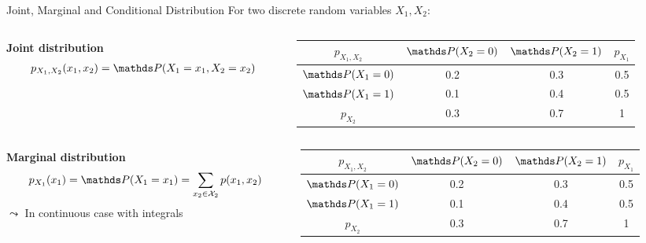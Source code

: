 \documentclass[10pt,compress,t,notes=noshow, xcolor=table]{beamer}
\begin{document}
\begin{frame}{Joint, Marginal and Conditional Distribution}
    For two discrete random variables $X_1, X_2$:
    
    \begin{columns}[c, totalwidth=\textwidth]
    \begin{column}{0.5\textwidth}
    \textbf{Joint distribution}
        \begin{align*}
            p_{X_1, X_2}(x_1,x_2) = \P(X_1 = x_1, X_2 = x_2) %
        \end{align*}
    \end{column}
    \begin{column}{0.5\textwidth}
    \begin{table}
    \scriptsize
        \begin{tabular}{|c|c|c|c|}
            \hline 
            $p_{X_1, X_2}$ & $\P(X_2 = 0)$ & $\P(X_2 = 1)$ & $p_{X_1}$ \\
            \hline
            $\P(X_1 = 0)$ & \cellcolor{gray}0.2 & \cellcolor{gray}0.3 & 0.5  \\
            \hline
            $\P(X_1 = 1)$ & \cellcolor{gray}0.1 & \cellcolor{gray}0.4 & 0.5  \\
            \hline
            $p_{X_2}$ & 0.3 & 0.7 & 1  \\
            \hline
        \end{tabular} 
    \end{table}
    \end{column}
    \end{columns} 

\medskip\pause
    
\begin{columns}[c, totalwidth=\textwidth]
    \begin{column}{0.5\textwidth}
    \textbf{Marginal distribution}
        \begin{align*}
            p_{X_1}(x_1) = \P(X_1 = x_1) = \sum_{x_2\in \mathcal{X}_2} p(x_1,x_2)
        \end{align*}    
        $\leadsto$ In continuous case with integrals
    \end{column}
    \begin{column}{0.5\textwidth}
    \begin{table}
    \scriptsize
        \begin{tabular}{|c|c|c|c|}
            \hline 
            $p_{X_1, X_2}$ & $\P(X_2 = 0)$ & $\P(X_2 = 1)$ & $p_{X_1}$ \\
            \hline
            $\P(X_1 = 0)$ & 0.2 & 0.3 & \cellcolor{gray}0.5  \\
            \hline
            $\P(X_1 = 1)$ & 0.1 & 0.4 & \cellcolor{gray}0.5  \\
            \hline
            $p_{X_2}$ & 0.3 & 0.7 & 1  \\
            \hline
        \end{tabular}
    \end{table}
    \end{column}
    \end{columns} 


\end{frame}
\end{document}

